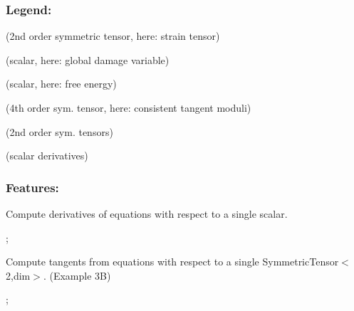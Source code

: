 \subsubsection*{Legend\+:}

\href{https://www.codecogs.com/eqnedit.php?latex=\boldsymbol{\varepsilon}}{\tt } (2nd order symmetric tensor, here\+: strain tensor)

\href{https://www.codecogs.com/eqnedit.php?latex=\varphi}{\tt } (scalar, here\+: global damage variable)

\href{https://www.codecogs.com/eqnedit.php?latex=\Psi&space;=&space;\Psi(\boldsymbol{\varepsilon},\varphi)}{\tt } (scalar, here\+: free energy)

\href{https://www.codecogs.com/eqnedit.php?latex=\overset{4}{C}}{\tt } (4th order sym. tensor, here\+: consistent tangent moduli)

\href{https://www.codecogs.com/eqnedit.php?latex=\boldsymbol{A,&space;B,&space;E,&space;F}}{\tt } (2nd order sym. tensors)

\href{https://www.codecogs.com/eqnedit.php?latex=D,&space;G}{\tt } (scalar derivatives)

\subsubsection*{Features\+:}


\begin{DoxyItemize}
\item Compute derivatives of equations with respect to a single scalar.
\end{DoxyItemize}

\href{https://www.codecogs.com/eqnedit.php?latex={D}&space;=&space;\frac{\partial{\Psi}}{\partial{\varphi&space;}}}{\tt } ; \href{https://www.codecogs.com/eqnedit.php?latex=\boldsymbol{A}&space;=&space;\frac{\partial\boldsymbol{\sigma}}{\partial{\varphi&space;}}}{\tt }


\begin{DoxyItemize}
\item Compute tangents from equations with respect to a single Symmetric\+Tensor$<$2,dim$>$. (Example 3B)
\end{DoxyItemize}

\href{https://www.codecogs.com/eqnedit.php?latex=\boldsymbol{B}&space;=&space;\frac{\partial{\Psi}}{\partial\boldsymbol{\varepsilon&space;}}}{\tt } ; \href{https://www.codecogs.com/eqnedit.php?latex=\overset{4}{C}&space;=&space;\frac{\partial\boldsymbol{\sigma}}{\partial\boldsymbol{\varepsilon&space;}}}{\tt }


